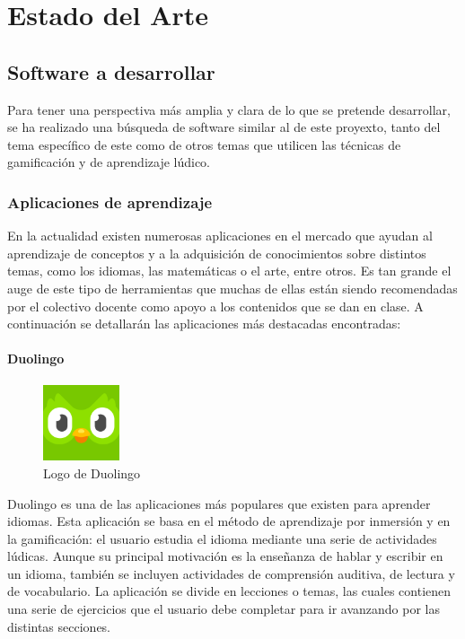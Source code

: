 \chapter{Estado del Arte}
\section{Software a desarrollar}
Para tener una perspectiva más amplia y clara de lo que se pretende desarrollar, se ha realizado una búsqueda de software similar al de este proyexto,
tanto del tema específico de este como de otros temas que utilicen las técnicas de gamificación y de aprendizaje lúdico.

\subsection{Aplicaciones de aprendizaje}
En la actualidad existen numerosas aplicaciones en el mercado que ayudan al aprendizaje de conceptos y a la adquisición de conocimientos sobre distintos temas, 
como los idiomas, las matemáticas o el arte, entre otros. Es tan grande el auge de este tipo de herramientas que muchas de ellas están siendo
recomendadas por el colectivo docente como apoyo a los contenidos que se dan en clase. A continuación se
detallarán las aplicaciones más destacadas encontradas:

\subsubsection{Duolingo}
\begin{figure}
    \vspace*{-0.4cm}

    \centering
    \includegraphics[width=0.2\textwidth]{imagenes/c2/duolingo.png}
    \caption{Logo de Duolingo}
    \vspace*{-0.15cm}
\end{figure}

Duolingo es una de las aplicaciones más populares que existen para aprender idiomas. Esta aplicación se basa en el método
de aprendizaje por inmersión y en la gamificación: el usuario estudia el idioma mediante una serie de actividades lúdicas.
Aunque su principal motivación es la enseñanza de hablar y escribir en un idioma, también se incluyen actividades de
comprensión auditiva, de lectura y de vocabulario.
\newpage
La aplicación se divide en lecciones o temas, las cuales contienen una serie de ejercicios que el usuario debe
completar para ir avanzando por las distintas secciones.

